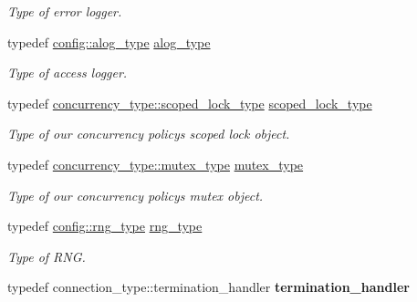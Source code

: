 \begin{DoxyCompactItemize}
\begin{DoxyCompactList}\small\item\em Type of error logger. \end{DoxyCompactList}\item 
typedef \hyperlink{classwebsocketpp_1_1log_1_1stub}{config\+::alog\+\_\+type} \hyperlink{classwebsocketpp_1_1endpoint_a1ca2ad5bfdd241a031746c3f158f4003}{alog\+\_\+type}\hypertarget{classwebsocketpp_1_1endpoint_a1ca2ad5bfdd241a031746c3f158f4003}{}\label{classwebsocketpp_1_1endpoint_a1ca2ad5bfdd241a031746c3f158f4003}

\begin{DoxyCompactList}\small\item\em Type of access logger. \end{DoxyCompactList}\item 
typedef \hyperlink{classwebsocketpp_1_1concurrency_1_1none_af2d121eeb6202694819578ba4bb00d3e}{concurrency\+\_\+type\+::scoped\+\_\+lock\+\_\+type} \hyperlink{classwebsocketpp_1_1endpoint_ae16d71c671d97d4b29c5fd5806d45815}{scoped\+\_\+lock\+\_\+type}\hypertarget{classwebsocketpp_1_1endpoint_ae16d71c671d97d4b29c5fd5806d45815}{}\label{classwebsocketpp_1_1endpoint_ae16d71c671d97d4b29c5fd5806d45815}

\begin{DoxyCompactList}\small\item\em Type of our concurrency policy\textquotesingle{}s scoped lock object. \end{DoxyCompactList}\item 
typedef \hyperlink{classwebsocketpp_1_1concurrency_1_1none_a3cf002cfc62e64e920a91a06f5e6fbc3}{concurrency\+\_\+type\+::mutex\+\_\+type} \hyperlink{classwebsocketpp_1_1endpoint_ab4aa523f6e1fddb2e77cdf7b36771992}{mutex\+\_\+type}\hypertarget{classwebsocketpp_1_1endpoint_ab4aa523f6e1fddb2e77cdf7b36771992}{}\label{classwebsocketpp_1_1endpoint_ab4aa523f6e1fddb2e77cdf7b36771992}

\begin{DoxyCompactList}\small\item\em Type of our concurrency policy\textquotesingle{}s mutex object. \end{DoxyCompactList}\item 
typedef \hyperlink{classwebsocketpp_1_1random_1_1none_1_1int__generator}{config\+::rng\+\_\+type} \hyperlink{classwebsocketpp_1_1endpoint_adbb0a9eea3ebbf5139966858bd0fa16d}{rng\+\_\+type}\hypertarget{classwebsocketpp_1_1endpoint_adbb0a9eea3ebbf5139966858bd0fa16d}{}\label{classwebsocketpp_1_1endpoint_adbb0a9eea3ebbf5139966858bd0fa16d}

\begin{DoxyCompactList}\small\item\em Type of R\+NG. \end{DoxyCompactList}\item 
typedef connection\+\_\+type\+::termination\+\_\+handler {\bfseries termination\+\_\+handler}\hypertarget{classwebsocketpp_1_1endpoint_a24710dbab3b51673b5459b7b609d5d66}{}\label{classwebsocketpp_1_1endpoint_a24710dbab3b51673b5459b7b609d5d66}

\end{DoxyCompactItemize}

